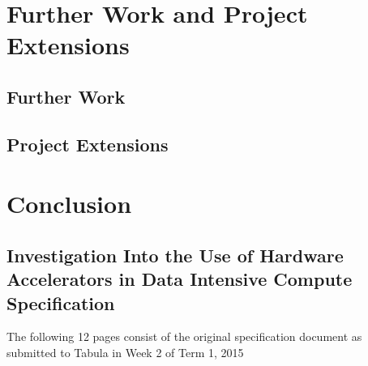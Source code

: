 \documentclass[12pt,a4paper]{article}
\begin{document}
    \section{Further Work and Project Extensions}
    \label{sec:further_work_project_extensions}
    
        \subsection{Further Work}
        \label{sub:further_work}
        
        
        \subsection{Project Extensions}
        \label{sub:project_extensions}
        
        
    \section{Conclusion}
    \label{sec:conclusion}
    

	\printbibliography
	
	\begin{appendix}
	    \section{Investigation Into the Use of Hardware Accelerators in Data Intensive Compute Specification}
	    The following 12 pages consist of the original specification document as submitted to Tabula in Week 2 of Term 1, 2015
	    \label{app:specification}
	    
	        
	\end{appendix}
\end{document}
